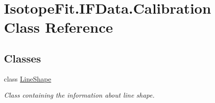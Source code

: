 \hypertarget{class_isotope_fit_1_1_i_f_data_1_1_calibration}{}\section{Isotope\+Fit.\+I\+F\+Data.\+Calibration Class Reference}
\label{class_isotope_fit_1_1_i_f_data_1_1_calibration}
\subsection*{Classes}
\begin{DoxyCompactItemize}
\item 
class \mbox{\hyperlink{class_isotope_fit_1_1_i_f_data_1_1_calibration_1_1_line_shape}{Line\+Shape}}
\begin{DoxyCompactList}\small\item\em Class containing the information about line shape. \end{DoxyCompactList}\end{DoxyCompactItemize}
